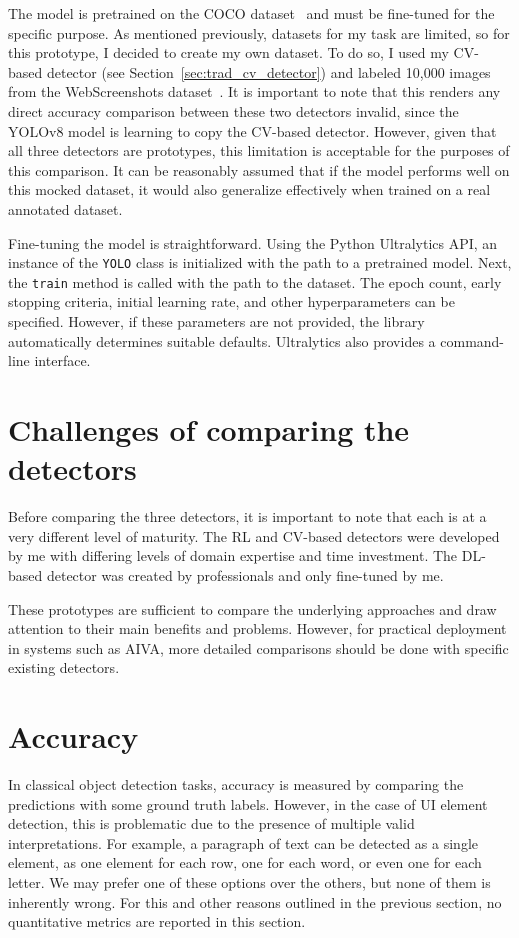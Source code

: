 \documentclass[
  digital,     %
  oneside,     %
  nosansbold,  %
  nocolorbold, %
  lof,         %
  lot,         %
]{fithesis4}
\begin{document}
The model is pretrained on the COCO dataset~\cite{COCO} and must be fine-tuned for the specific purpose. As mentioned previously, datasets for my task are limited, so for this prototype, I decided to create my own dataset. To do so, I used my CV-based detector (see Section~\ref{sec:trad_cv_detector}) and labeled 10,000 images from the WebScreenshots dataset~\cite{aydos2020}. It is important to note that this renders any direct accuracy comparison between these two detectors invalid, since the YOLOv8 model is learning to copy the CV-based detector. However, given that all three detectors are prototypes, this limitation is acceptable for the purposes of this comparison. It can be reasonably assumed that if the model performs well on this mocked dataset, it would also generalize effectively when trained on a real annotated dataset.

Fine-tuning the model is straightforward. Using the Python Ultralytics API, an instance of the \texttt{YOLO} class is initialized with the path to a pretrained model. Next, the \texttt{train} method is called with the path to the dataset. The epoch count, early stopping criteria, initial learning rate, and other hyperparameters can be specified. However, if these parameters are not provided, the library automatically determines suitable defaults. Ultralytics also provides a command-line interface.

\section{Challenges of comparing the detectors}

Before comparing the three detectors, it is important to note that each is at a very different level of maturity. The RL and CV-based detectors were developed by me with differing levels of domain expertise and time investment. The DL-based detector was created by professionals and only fine-tuned by me.

These prototypes are sufficient to compare the underlying approaches and draw attention to their main benefits and problems. However, for practical deployment in systems such as AIVA, more detailed comparisons should be done with specific existing detectors.

\section{Accuracy}

In classical object detection tasks, accuracy is measured by comparing the predictions with some ground truth labels. However, in the case of UI element detection, this is problematic due to the presence of multiple valid interpretations. For example, a paragraph of text can be detected as a single element, as one element for each row, one for each word, or even one for each letter. We may prefer one of these options over the others, but none of them is inherently wrong. For this and other reasons outlined in the previous section, no quantitative metrics are reported in this section.
\end{document}

